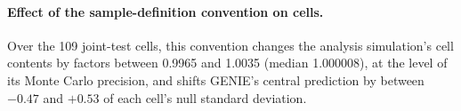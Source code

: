 \paragraph{Effect of the sample-definition convention on cells.} Over the 109 joint-test cells, this convention changes the analysis simulation's cell contents by factors between 0.9965 and 1.0035 (median 1.000008), at the level of its Monte Carlo precision, and shifts GENIE's central prediction by between $-0.47$ and $+0.53$ of each cell's null standard deviation.

